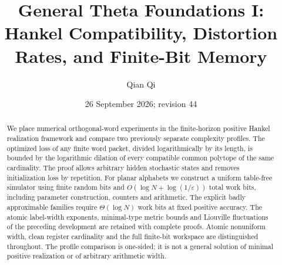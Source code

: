 \documentclass[11pt]{amsart}
\title[Hankel compatibility and finite-bit memory]{General Theta Foundations I: Hankel Compatibility, Distortion Rates, and Finite-Bit Memory}
\author{Qian Qi}
\date{26 September 2026; revision 44}
\numberwithin{equation}{section}
\theoremstyle{definition}\newtheorem{definition}[theorem]{Definition}
\begin{document}
\begin{abstract}
We place numerical orthogonal-word experiments in the finite-horizon
positive Hankel realization framework and compare two previously
separate complexity profiles. The optimized loss of any finite word
packet, divided logarithmically by its length, is bounded by the
logarithmic dilation of every compatible common polytope of the same
cardinality. The proof allows arbitrary hidden stochastic states and
removes initialization loss by repetition. For planar alphabets we
construct a uniform table-free simulator using finite random bits and
$O(\log N+\log(1/\varepsilon))$ total work bits, including parameter
construction, counters and arithmetic. The explicit badly approximable
families require $\Theta(\log N)$ work bits at fixed positive accuracy.
The atomic label-width exponents, minimal-type metric bounds and
Liouville fluctuations of the preceding development are retained with
complete proofs. Atomic nonuniform width, clean register cardinality
and the full finite-bit workspace are distinguished throughout. The
profile comparison is one-sided; it is not a general solution of
minimal positive realization or of arbitrary arithmetic width.
\end{abstract}
\maketitle












\end{document}
